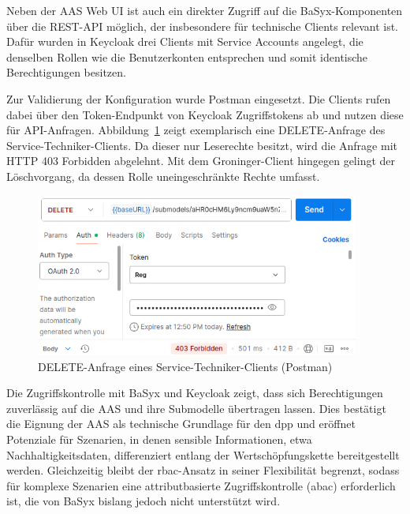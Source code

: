 Neben der AAS Web UI ist auch ein direkter Zugriff auf die BaSyx-Komponenten über die REST-API möglich, der insbesondere für technische Clients relevant ist. 
Dafür wurden in Keycloak drei Clients mit Service Accounts angelegt, die denselben Rollen wie die Benutzerkonten entsprechen und somit identische Berechtigungen besitzen.

Zur Validierung der Konfiguration wurde Postman eingesetzt. 
Die Clients rufen dabei über den Token-Endpunkt von Keycloak Zugriffstokens ab und nutzen diese für API-Anfragen. 
Abbildung~\ref{fig:DELETEServiceTechniker} zeigt exemplarisch eine DELETE-Anfrage des Service-Techniker-Clients. 
Da dieser nur Leserechte besitzt, wird die Anfrage mit HTTP 403 Forbidden abgelehnt. 
Mit dem Groninger-Client hingegen gelingt der Löschvorgang, da dessen Rolle uneingeschränkte Rechte umfasst.

\begin{figure}[htbp]
    \centering
        \includegraphics[width=0.95\textwidth]{Bilder/Ergebnisse/DPP/Postman/TechnicianDelet.png}
    \caption[DELETE-Anfrage eines Service-Techniker-Clients]{DELETE-Anfrage eines Service-Techniker-Clients (Postman)}
    \label{fig:DELETEServiceTechniker}
\end{figure}
\vspace{-0.25em}

Die Zugriffskontrolle mit BaSyx und Keycloak zeigt, dass sich Berechtigungen zuverlässig auf die AAS und ihre Submodelle übertragen lassen. 
Dies bestätigt die Eignung der AAS als technische Grundlage für den \acs{dpp} und eröffnet Potenziale für Szenarien, in denen sensible Informationen, etwa Nachhaltigkeitsdaten, differenziert entlang der Wertschöpfungskette bereitgestellt werden. 
Gleichzeitig bleibt der \acs{rbac}-Ansatz in seiner Flexibilität begrenzt, sodass für komplexe Szenarien eine attributbasierte Zugriffskontrolle (\acs{abac}) erforderlich ist, die von BaSyx bislang jedoch nicht unterstützt wird.

